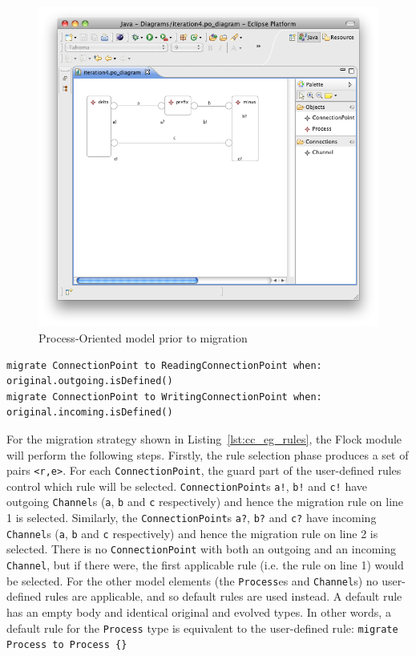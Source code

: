 \begin{figure}[htbp]
	\centering
		\includegraphics[scale=0.5]{A.2.ProcessOriented/images/4_model.png}
	\caption{Process-Oriented model prior to migration}
	\label{fig:cc_eg_model}
\end{figure}

\begin{lstlisting}[float=tbp, caption=Redefining equivalences for the Component model migration., label=lst:cc_eg_rules, language=Flock]
migrate ConnectionPoint to ReadingConnectionPoint when: original.outgoing.isDefined()
migrate ConnectionPoint to WritingConnectionPoint when: original.incoming.isDefined()
\end{lstlisting}

For the migration strategy shown in Listing~\ref{lst:cc_eg_rules}, the Flock module will perform the following steps. Firstly, the rule selection phase produces a set of pairs \texttt{<r,e>}. For each \texttt{ConnectionPoint}, the guard part of the user-defined rules control which rule will be selected. \texttt{ConnectionPoint}s \texttt{a!}, \texttt{b!} and \texttt{c!} have outgoing \texttt{Channel}s (\texttt{a}, \texttt{b} and \texttt{c} respectively) and hence the migration rule on line 1 is selected. Similarly, the \texttt{ConnectionPoint}s \texttt{a?}, \texttt{b?} and \texttt{c?} have incoming \texttt{Channel}s (\texttt{a}, \texttt{b} and \texttt{c} respectively) and hence the migration rule on line 2 is selected. There is no \texttt{ConnectionPoint} with both an outgoing and an incoming \texttt{Channel}, but if there were, the first applicable rule (i.e. the rule on line 1) would be selected. For the other model elements (the \texttt{Process}es and \texttt{Channel}s) no user-defined rules are applicable, and so default rules are used instead. A default rule has an empty body and identical original and evolved types. In other words, a default rule for the \texttt{Process} type is equivalent to the user-defined rule: \texttt{migrate Process to Process \{\}}

